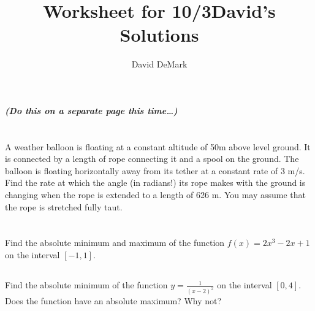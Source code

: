 \documentclass[english]{article}
\title{Worksheet for 10/3\textemdash David's Solutions}
\author{David DeMark}
\date{\due}
\newcommand{\prob}[1]{\setcounter{section}{#1-1}\section{}}
\newcommand{\prt}[1]{\setcounter{subsection}{#1-1}\subsection{}}
\theoremstyle{remark}
\theoremstyle{definition}
\begin{document}
\textbf{\textit{(Do this on a separate page this time\dots)}}
\prob{1}
{A weather balloon is floating at a constant altitude of 50m above level ground. It is connected by a length of rope connecting it and a spool on the ground. The balloon is floating horizontally away from its tether at a constant rate of 3 m/s. Find the rate at which the angle (in radians!) its rope makes with the ground is changing when the rope is extended to a length of 626 m. You may assume that the rope is stretched fully taut.}\vspace{1cm}
\prob{2}

\prob{3}\prt{1}
Find the absolute minimum and maximum of the function $f(x)=2x^3-2x+1$ on the interval $[-1,1]$.
\prt{2}
Find the absolute minimum of the function $y=\frac{1}{(x-2)^2}$ on the interval $[0,4]$. Does the function have an absolute maximum? Why not?
\end{document}
